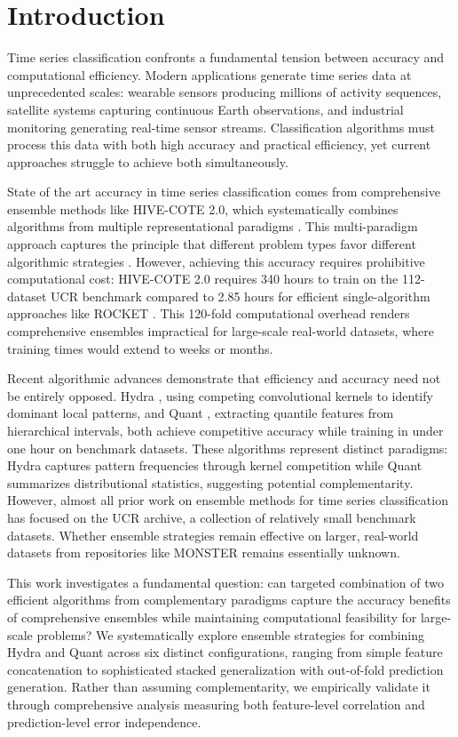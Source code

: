 \documentclass[pdflatex,sn-basic]{sn-jnl}           %
\theoremstyle{thmstyleone}%
\theoremstyle{thmstyletwo}%
\theoremstyle{thmstylethree}%
\begin{document}
\section{Introduction}\label{sec1}

Time series classification confronts a fundamental tension between accuracy and computational efficiency. Modern applications generate time series data at unprecedented scales: wearable sensors producing millions of activity sequences, satellite systems capturing continuous Earth observations, and industrial monitoring generating real-time sensor streams. Classification algorithms must process this data with both high accuracy and practical efficiency, yet current approaches struggle to achieve both simultaneously.

State of the art accuracy in time series classification comes from comprehensive ensemble methods like HIVE-COTE 2.0, which systematically combines algorithms from multiple representational paradigms \citep{hive-cote-2}. This multi-paradigm approach captures the principle that different problem types favor different algorithmic strategies \citep{tsc-bakeoff}. However, achieving this accuracy requires prohibitive computational cost: HIVE-COTE 2.0 requires 340 hours to train on the 112-dataset UCR benchmark compared to 2.85 hours for efficient single-algorithm approaches like ROCKET \citep{hive-cote-2}. This 120-fold computational overhead renders comprehensive ensembles impractical for large-scale real-world datasets, where training times would extend to weeks or months.

Recent algorithmic advances demonstrate that efficiency and accuracy need not be entirely opposed. Hydra \citep{hydra}, using competing convolutional kernels to identify dominant local patterns, and Quant \citep{quant}, extracting quantile features from hierarchical intervals, both achieve competitive accuracy while training in under one hour on benchmark datasets. These algorithms represent distinct paradigms: Hydra captures pattern frequencies through kernel competition while Quant summarizes distributional statistics, suggesting potential complementarity. However, almost all prior work on ensemble methods for time series classification has focused on the UCR archive, a collection of relatively small benchmark datasets. Whether ensemble strategies remain effective on larger, real-world datasets from repositories like MONSTER \citep{monster} remains essentially unknown.

This work investigates a fundamental question: can targeted combination of two efficient algorithms from complementary paradigms capture the accuracy benefits of comprehensive ensembles while maintaining computational feasibility for large-scale problems? We systematically explore ensemble strategies for combining Hydra and Quant across six distinct configurations, ranging from simple feature concatenation to sophisticated stacked generalization with out-of-fold prediction generation. Rather than assuming complementarity, we empirically validate it through comprehensive analysis measuring both feature-level correlation and prediction-level error independence.
\end{document}
